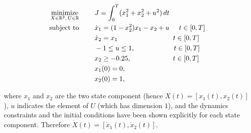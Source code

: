 \begin{subequations}\label{eq:vanderpol}
	\begin{align}
	\underset{X \in \mathbb{R}^{2}, \, U \in \mathbb{R}}{\text{minimize}}\hspace{8mm} 
	&J = \int_{0}^{T}(x_1^{2} + x_2^{2} + u^{2})\,dt  \label{eq:vancost}\\
	\text{subject to} \hspace{8mm} 
	& \dot{x}_1 = (1 - x_2^{2})x_{1} - x_2 + u \hspace{5mm} t \in[0,T] \label{eq:vandyn1}\\
	& \dot{x}_2 = x_1 \hspace{28.5mm} t \in[0,T] \label{eq:vandyn2}\\
	& -1  \leq u \leq 1,  \hspace{20mm} t \in[0,T] \label{eq:vanpath1}\\
	& x_2 \geq -0.25,  \hspace{21.5mm} t \in[0,T] \label{eq:vanpath2}\\
	& x_1(0) = 0, \label{eq:initial1}\\		
	& x_2(0) = 1, \label{eq:intial2}		
	\end{align}
\end{subequations}

where $x_1$ and $x_2$ are the two state component (hence $X(t) = [x_1(t), x_2(t)]$), $u$ indicates the element of $U$ (which has dimension $1$), and the dynamics constraints and the initial conditions have been shown explicitly for each state component. Therefore $\dot{X}(t) = [\dot{x}_1(t), \dot{x}_2(t)]$.

